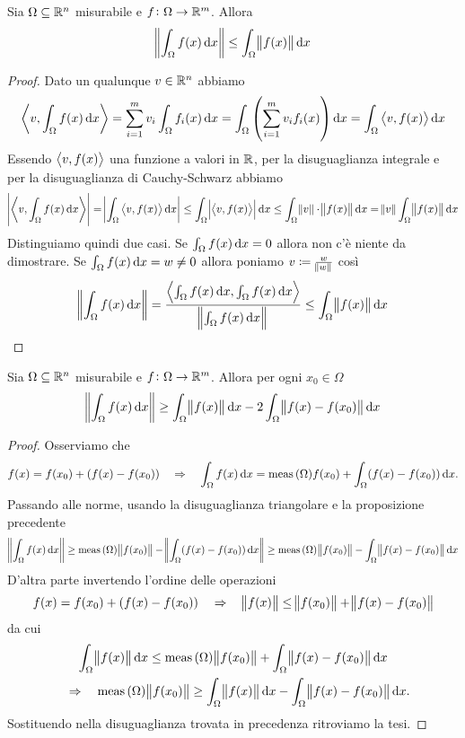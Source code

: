 \begin{prop} \label{prop:leqintegrale}
	Sia $ \Omega \subseteq \R^n $ misurabile e $ f \colon \Omega \to \R^m $. Allora 
	\begin{equation}
		\norm{\int_{\Omega} f(x) \dif{x}} \leq \int_{\Omega} \norm{f(x)} \dif{x}
	\end{equation}
\end{prop}
%
\begin{proof}
	Dato un qualunque $ v \in \R^n $ abbiamo
	\[
		\sp{v}{\int_{\Omega} f(x) \dif{x}} = \sum_{i = 1}^{m} v_i \int_{\Omega} f_i(x) \dif{x} = \int_{\Omega} \left(\sum_{i = 1}^{m} v_i f_i(x)\right) \dif{x} = \int_{\Omega} \sp{v}{f(x)} \dif{x}
	\]
	Essendo $ \sp{v}{f(x)} $ una funzione a valori in $ \R $, per la disuguaglianza integrale e per la disuguaglianza di Cauchy-Schwarz abbiamo
	\[
		\abs{\sp{v}{\int_{\Omega} f(x) \dif{x}}} = \abs{\int_{\Omega} \sp{v}{f(x)} \dif{x}} \leq \int_{\Omega} \abs{\sp{v}{f(x)}}\dif{x} \leq \int_{\Omega} \norm{v} \cdot \norm{f(x)} \dif{x} = \norm{v} \int_{\Omega} \norm{f(x)} \dif{x}
	\]
	Distinguiamo quindi due casi. Se $ \int_{\Omega} f(x) \dif{x} = 0 $ allora non c'è niente da dimostrare. Se $ \int_{\Omega} f(x) \dif{x} = w \neq 0 $ allora poniamo $ v \coloneqq \frac{w}{\norm{w}} $ così
	\[
		\norm{\int_{\Omega} f(x) \dif{x}} = \frac{\sp{\int_{\Omega} f(x) \dif{x}}{\int_{\Omega} f(x) \dif{x}}}{\norm{\int_{\Omega} f(x) \dif{x}}} \leq \int_{\Omega} \norm{f(x)} \dif{x} \qedhere
	\]
\end{proof}

\begin{prop} \label{prop:geqintegrale}
	Sia $ \Omega \subseteq \R^n $ misurabile e $ f \colon \Omega \to \R^m $. Allora per ogni $ x_0 \in \Omega $
	\begin{equation}
		\norm{\int_{\Omega} f(x) \dif{x}} \geq \int_{\Omega} \norm{f(x)} \dif{x} - 2 \int_{\Omega} \norm{f(x) - f(x_0)} \dif{x}
	\end{equation}
\end{prop}
%
\begin{proof}
	Osserviamo che 
	\[
		f(x) = f(x_0) + (f(x) - f(x_0)) \quad \Rightarrow \quad \int_{\Omega} f(x) \dif{x} = \meas{(\Omega)} f(x_0) + \int_{\Omega} (f(x) - f(x_0)) \dif{x}.
	\]
	Passando alle norme, usando la disuguaglianza triangolare e la proposizione precedente
	\[
		\norm{\int_{\Omega} f(x) \dif{x}} \geq \meas{(\Omega)} \norm{f(x_0)} - \norm{\int_{\Omega} (f(x) - f(x_0)) \dif{x}} \geq \meas{(\Omega)} \norm{f(x_0)} - \int_{\Omega} \norm{f(x) - f(x_0)} \dif{x}
	\]
	D'altra parte invertendo l'ordine delle operazioni
	\[
		f(x) = f(x_0) + (f(x) - f(x_0)) \quad \Rightarrow \quad \norm{f(x)} \leq \norm{f(x_0)} + \norm{f(x) - f(x_0)}
	\]
	da cui
	\begin{gather*}
		\int_{\Omega} \norm{f(x)} \dif{x} \leq \meas{(\Omega)} \norm{f(x_0)} + \int_{\Omega} \norm{f(x) - f(x_0)} \dif{x} \\
		\quad \Rightarrow \quad \meas{(\Omega)} \norm{f(x_0)} \geq \int_{\Omega} \norm{f(x)} \dif{x} - \int_{\Omega} \norm{f(x) - f(x_0)} \dif{x}.
	\end{gather*}
	Sostituendo nella disuguaglianza trovata in precedenza ritroviamo la tesi. 
\end{proof}
